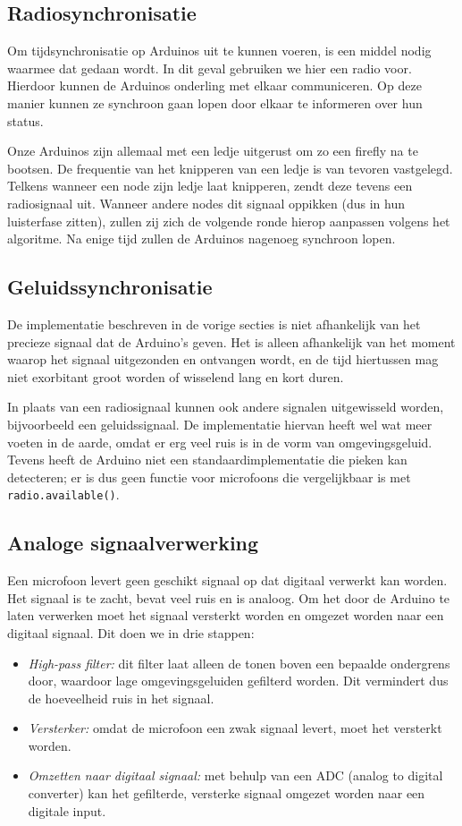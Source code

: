 \documentclass[a4paper,10pt]{article}
\begin{document}
\subsection{Radiosynchronisatie}\label{sec:radiosync}
Om tijdsynchronisatie op Arduinos uit te kunnen voeren, is een middel nodig waarmee dat gedaan wordt. In dit geval gebruiken we hier een radio voor. Hierdoor kunnen de Arduinos onderling met elkaar communiceren. Op deze manier kunnen ze synchroon gaan lopen door elkaar te informeren over hun status.

Onze Arduinos zijn allemaal met een ledje uitgerust om zo een firefly na te bootsen. De frequentie van het knipperen van een ledje is van tevoren vastgelegd. Telkens wanneer een node zijn ledje laat knipperen, zendt deze tevens een radiosignaal uit. Wanneer andere nodes dit signaal oppikken (dus in hun luisterfase zitten), zullen zij zich de volgende ronde hierop aanpassen volgens het algoritme. Na enige tijd zullen de Arduinos nagenoeg synchroon lopen.

\subsection{Geluidssynchronisatie}\label{sec:geluidssec}
De implementatie beschreven in de vorige secties is niet afhankelijk van het precieze signaal dat de Arduino's geven. Het is alleen afhankelijk van het moment waarop het signaal uitgezonden en ontvangen wordt, en de tijd hiertussen mag niet exorbitant groot worden of wisselend lang en kort duren.

In plaats van een radiosignaal kunnen ook andere signalen uitgewisseld worden, bijvoorbeeld een geluidssignaal. De implementatie hiervan heeft wel wat meer voeten in de aarde, omdat er erg veel ruis is in de vorm van omgevingsgeluid. Tevens heeft de Arduino niet een standaardimplementatie die pieken kan detecteren; er is dus geen functie voor microfoons die vergelijkbaar is met \texttt{radio.available()}.

\subsection{Analoge signaalverwerking}
Een microfoon levert geen geschikt signaal op dat digitaal verwerkt kan worden. Het signaal is te zacht, bevat veel ruis en is analoog. Om het door de Arduino te laten verwerken moet het signaal versterkt worden en omgezet worden naar een digitaal signaal. Dit doen we in drie stappen:
\begin{itemize}
    \item \textit{High-pass filter:} dit filter laat alleen de tonen boven een bepaalde ondergrens door, waardoor lage omgevingsgeluiden gefilterd worden. Dit vermindert dus de hoeveelheid ruis in het signaal.
    \item \textit{Versterker:} omdat de microfoon een zwak signaal levert, moet het versterkt worden.
    \item \textit{Omzetten naar digitaal signaal:} met behulp van een ADC (analog to digital converter) kan het gefilterde, versterke signaal omgezet worden naar een digitale input.
\end{itemize}
\end{document}
